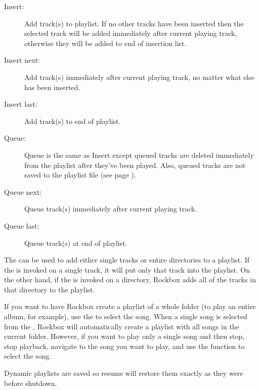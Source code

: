 \begin{description}
\item [Insert:]
  Add track(s) to playlist. If no other tracks have been inserted then the
  selected track will be added immediately after current playing track,
  otherwise they will be added to end of insertion list.
\item [Insert next:] 
  Add track(s) immediately after current playing track, no matter what else has
  been inserted.
\item [Insert last:]
  Add track(s) to end of playlist.
\item [Queue:]
  Queue is the same as Insert except queued tracks are deleted immediately from
  the playlist after they've been played. Also, queued tracks are not saved to
  the playlist file (see page \pageref{ref:playlistoptions}).
\item [Queue next:]
  Queue track(s) immediately after current playing track.
\item [Queue last:]
  Queue track(s) at end of playlist.
\end{description}

The  can be used to add either single tracks or 
entire directories to a playlist. If the  is 
invoked on a single track, it will put only that track into the playlist.  
On the other hand, if the  is invoked on a 
directory, Rockbox adds all of the tracks in that directory to the playlist.  


If you want to have Rockbox create a playlist of a whole folder (to play an entire 
album, for example), use the  to select the song. When a single 
song is selected from the , Rockbox will automatically create a 
playlist with all songs in the current folder. However, if you want to play only a single 
song and then stop, stop playback, navigate to the song you want to play, and use the 
 function to select the song.

Dynamic playlists are saved so resume will restore them exactly as they were before
shutdown.

